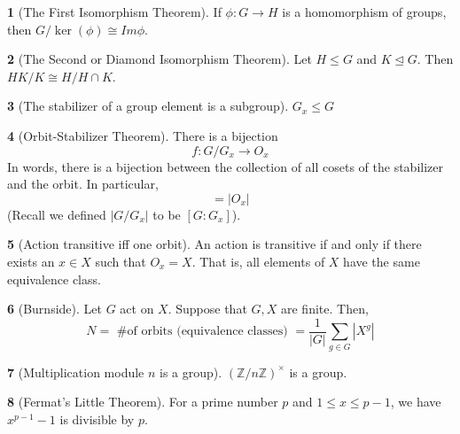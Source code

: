 \documentclass[12pt]{article}
\theoremstyle{definition}
\newtheorem{theorem}{\color{ForestGreen}{\textbf{Theorem}}}
\begin{document}
\begin{theorem}[The First Isomorphism Theorem]
If $\phi:G\to H$ is a homomorphism of groups, then $G / \ker(\phi) \cong Im \phi$.
\end{theorem}

\begin{theorem}[The Second or Diamond Isomorphism Theorem]
Let $H \leq G$ and $K \trianglelefteq G$. Then $HK / K \cong H / H \cap K$.
\end{theorem}

\begin{theorem}[The stabilizer of a group element is a subgroup]
$G_x \leq G$
\end{theorem}

\begin{theorem}[Orbit-Stabilizer Theorem]
There is a bijection
\begin{equation}
f : G / G_x \to O_x
\end{equation}
In words, there is a bijection between the collection of all cosets of the stabilizer and the orbit. In particular,
\begin{equation}
[G:G_x] = |O_x|
\end{equation}
(Recall we defined $|G / G_x|$ to be $[G:G_x]$).
\end{theorem}

\begin{theorem}[Action transitive iff one orbit]
An action is transitive if and only if there exists an $x \in X$ such that $O_x = X$. That is, all elements of $X$ have the same equivalence class.
\end{theorem}

\begin{theorem}[Burnside]
Let $G$ act on $X$. Suppose that $G,X$ are finite. Then,
\begin{equation}
N = \text{ \# of orbits (equivalence classes) } = \frac{1}{|G|} \sum_{g\in G} |X^g|
\end{equation}
\end{theorem}

\begin{theorem}[Multiplication module $n$ is a group]
$(\mathbb{Z}/n \mathbb{Z})^{\times}$ is a group.
\end{theorem}

\begin{theorem}[Fermat's Little Theorem]
For a prime number $p$ and $1 \leq x \leq p-1$, we have $x^{p-1} - 1$ is divisible by $p$.
\end{theorem}
\end{document}
